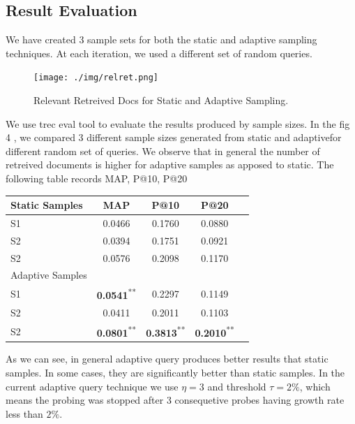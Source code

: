 \documentclass[paper=a4, fontsize=11pt,twoside]{scrartcl}	%
\begin{document}
\subsection{Result Evaluation}

We have created 3 sample sets for both the static and adaptive sampling techniques. At each iteration, we used a different set of random queries.

\begin{figure}[H]
\centering
\texttt{[image: ./img/relret.png]}
\caption{\label{fig:4}Relevant Retreived Docs for Static and Adaptive Sampling.}
\end{figure}

We use trec eval tool to evaluate the results produced by sample sizes.
In the fig 4 , we compared 3 different sample sizes generated from static and adaptivefor different random set of queries. We observe that in general the number of retreived documents is higher for adaptive samples as apposed to static. 
The following table records MAP, P@10, P@20

\begin{table}[!ht]
\captionsetup{justification=justified,singlelinecheck=off}
 \label{tab:title} 
\begin{tabular}{l*{3}{c}r}
\\\toprule
Static Samples              & MAP & P@10 & P@20  
\\\toprule
S1 & 0.0466 & 0.1760 & 0.0880 \\
S2 & 0.0394 & 0.1751 & 0.0921  \\
S2 & 0.0576 & 0.2098 & 0.1170   
\\\toprule
Adaptive Samples 
\\\toprule
S1 & \textbf{0.0541}\textsuperscript{**} & 0.2297 & 0.1149\\
S2 & 0.0411 & 0.2011 & 0.1103   \\
S2 & \textbf{0.0801}\textsuperscript{**} & \textbf{0.3813}\textsuperscript{**} & \textbf{0.2010}\textsuperscript{**}   \\
\end{tabular}
\end{table}

As we can see, in general adaptive query produces better results that static samples. In some cases, they are significantly better than static samples. In the current adaptive query technique we use $\eta = 3$ and threshold $\tau = 2\%$, which means the probing was stopped after 3 consequetive probes having growth rate less than $2\%$.
\end{document}
